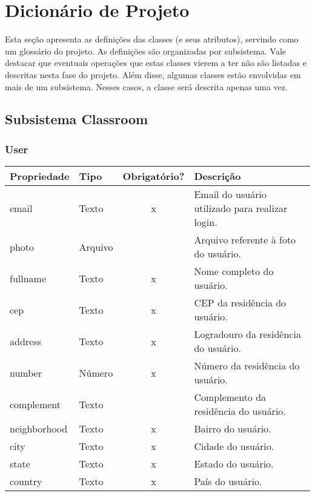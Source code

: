 \chapter{Dicionário de Projeto}
\label{sec-dicionario}
\setcounter{table}{0}

Esta seção apresenta as definições das classes (e seus atributos), servindo como um glossário do projeto. As definições são organizadas por subsistema. Vale destacar que eventuais operações que estas classes vierem a ter não são listadas e descritas nesta fase do projeto. Além disse, algumas classes estão envolvidas em mais de um subsistema. Nesses casos, a classe será descrita apenas uma vez.


\section{Subsistema Classroom}

\subsection{User} \label{User}
\begin{table}[H]
	\footnotesize
	\begin{tabularx}{\textwidth}{|p{2.6cm}|X|c|p{7.8cm}|}   \hline \rowcolor[rgb]{0.8,0.8,0.8}
		
		\textbf{Propriedade} & \textbf{Tipo} & \textbf{Obrigatório?} & \centerline{\textbf{Descrição}} \\\hline  	
		
		email & Texto & x & Email do usuário utilizado para realizar login. \\\hline	
		photo & Arquivo & {} & Arquivo referente à foto do usuário. \\\hline	
		fullname & Texto & x & Nome completo do usuário. \\\hline	
		cep & Texto & x & CEP da residência do usuário. \\\hline	
		address & Texto & x & Logradouro da residência do usuário. \\\hline	
		number & Número & x & Número da residência do usuário. \\\hline	
		complement & Texto & {} & Complemento da residência do usuário. \\\hline	
		neighborhood & Texto & x & Bairro do usuário. \\\hline	
		city & Texto & x & Cidade do usuário. \\\hline	
		state & Texto & x & Estado do usuário. \\\hline	
		country & Texto & x & País do usuário. \\\hline	
		
	\end{tabularx}	
\end{table}



